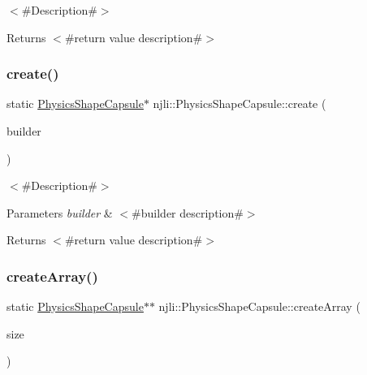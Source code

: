 $<$\#\+Description\#$>$

\begin{DoxyReturn}{Returns}
$<$\#return value description\#$>$ 
\end{DoxyReturn}
\mbox{\label{classnjli_1_1_physics_shape_capsule_a4c14553480dab63092c10f6b9cac7fe2}} 
\subsubsection{\texorpdfstring{create()}{create()}\hspace{0.1cm}{\footnotesize\ttfamily [2/2]}}
{\footnotesize\ttfamily static \mbox{\hyperlink{classnjli_1_1_physics_shape_capsule}{Physics\+Shape\+Capsule}}$\ast$ njli\+::\+Physics\+Shape\+Capsule\+::create (\begin{DoxyParamCaption}\item[{const \mbox{\hyperlink{classnjli_1_1_physics_shape_capsule_builder}{Physics\+Shape\+Capsule\+Builder}} \&}]{builder }\end{DoxyParamCaption})\hspace{0.3cm}{\ttfamily [static]}}

$<$\#\+Description\#$>$


\begin{DoxyParams}{Parameters}
{\em builder} & $<$\#builder description\#$>$\\
\hline
\end{DoxyParams}
\begin{DoxyReturn}{Returns}
$<$\#return value description\#$>$ 
\end{DoxyReturn}
\mbox{\label{classnjli_1_1_physics_shape_capsule_a9234db71fb65c7514e32b384c07359ed}} 
\subsubsection{\texorpdfstring{create\+Array()}{createArray()}}
{\footnotesize\ttfamily static \mbox{\hyperlink{classnjli_1_1_physics_shape_capsule}{Physics\+Shape\+Capsule}}$\ast$$\ast$ njli\+::\+Physics\+Shape\+Capsule\+::create\+Array (\begin{DoxyParamCaption}\item[{const \mbox{\hyperlink{_util_8h_a10e94b422ef0c20dcdec20d31a1f5049}{u32}}}]{size }\end{DoxyParamCaption})\hspace{0.3cm}{\ttfamily [static]}}

